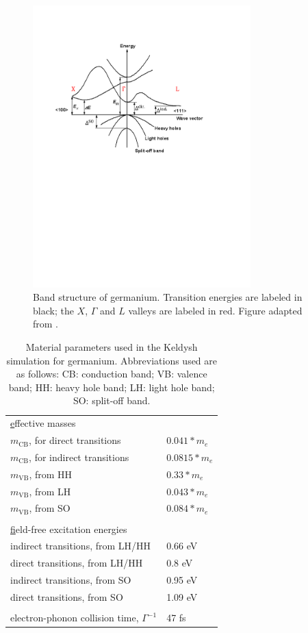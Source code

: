 \begin{figure}
	\centering
	\includegraphics[width=0.75\textwidth]{figures/chap4/Ge_band_structure.pdf}
	\caption{Band structure of germanium. Transition energies are labeled in black; the $X$, $\Gamma$ and $L$ valleys are labeled in red. Figure adapted from \cite{NSMArchivePhysical}.}
	\label{fig:Ge_band_structure}
\end{figure}


\begin{table}[]
	\centering
	\begin{tabular}{ll}
		{\ul effective masses} &  \\
		$m_{\textrm{CB}}$, for direct transitions & $0.041 * m_e$ \\
		$m_{\textrm{CB}}$, for indirect transitions & $0.0815 * m_e$ \\
		$m_{\textrm{VB}}$, from HH & $0.33 * m_e$ \\
		$m_{\textrm{VB}}$, from LH & $0.043 * m_e$ \\
		$m_{\textrm{VB}}$, from SO & $0.084 * m_e$ \\
		&  \\
		{\ul field-free excitation energies} &  \\
		indirect transitions,  from LH/HH & 0.66 eV \\
		direct transitions, from LH/HH & 0.8 eV \\
		indirect transitions, from SO & 0.95 eV \\
		direct transitions,  from SO & 1.09 eV \\
		&  \\
		electron-phonon collision time, $\Gamma^{-1}$ & 47 fs
	\end{tabular}
	\caption{Material parameters used in the Keldysh simulation for germanium. Abbreviations used are as follows: CB: conduction band; VB: valence band; HH: heavy hole band; LH: light hole band; SO: split-off band.}
	\label{tab:Keldysh_parameters}
\end{table}

